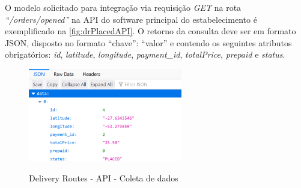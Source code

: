 O modelo solicitado para integração via requisição \textit{GET} na rota \textit{“/orders/opened”} na API do software principal do estabelecimento é exemplificado na \autoref{fig:drPlacedAPI}. O retorno da consulta deve ser em formato JSON, disposto no formato “chave”: “valor” e contendo os seguintes atributos obrigatórios: \textit{id}, \textit{latitude}, \textit{longitude}, \textit{payment\_id}, \textit{totalPrice}, \textit{prepaid} e \textit{status}.

\begin{figure}[H]
    \centering
    \caption{Delivery Routes - API - Coleta de dados}
    \includegraphics[width=0.6\textwidth]{./dados/figuras/fig14}
    \label{fig:drPlacedAPI}
\end{figure}